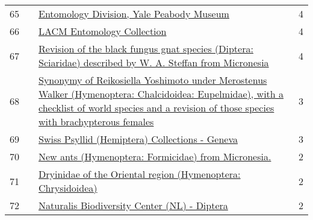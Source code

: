 \begin{longtable}{llp{5in}r}
65 &    &                                                                                                                                                         \href{https://www.gbif.org/dataset/96404cc2-f762-11e1-a439-00145eb45e9a}{Entomology Division, Yale Peabody Museum} &             4 \\
66 &    &                                                                                                                                                                       \href{https://www.gbif.org/dataset/0ec927cf-325a-4d63-9499-d721c734463a}{LACM Entomology Collection} &             4 \\
67 &    &                                                                                        \href{https://www.gbif.org/dataset/60161840-b9ca-420f-9ef4-c0918e409da6}{Revision of the black fungus gnat species (Diptera: Sciaridae) described by W. A. Steffan from Micronesia} &             4 \\
68 &    &  \href{https://www.gbif.org/dataset/4a65facc-ae9e-4379-a86f-0d8d34f58096}{Synonymy of Reikosiella Yoshimoto under Merostenus Walker (Hymenoptera: Chalcidoidea: Eupelmidae), with a checklist of world species and a revision of those species with brachypterous females} &             3 \\
69 &    &                                                                                                                                                   \href{https://www.gbif.org/dataset/82a7898c-f762-11e1-a439-00145eb45e9a}{Swiss Psyllid (Hemiptera) Collections - Geneva} &             3 \\
70 &    &                                                                                                                                              \href{https://www.gbif.org/dataset/2c7e0e7d-190e-4d9e-9c37-8c9e1d12f52b}{New ants (Hymenoptera: Formicidae) from Micronesia.} &             2 \\
71 &    &                                                                                                                                     \href{https://www.gbif.org/dataset/aea75e24-7003-4c32-b29c-1e0512af5f96}{Dryinidae of the Oriental region (Hymenoptera: Chrysidoidea)} &             2 \\
72 &    &                                                                                                                                                     \href{https://www.gbif.org/dataset/6a0a95c6-c07a-4c35-9e9f-f776e8730fd4}{Naturalis Biodiversity Center (NL) - Diptera} &             2 \\

\end{longtable}
